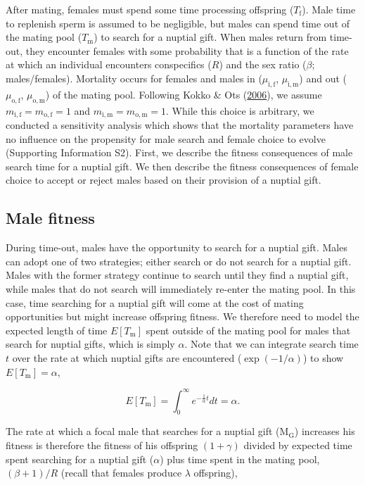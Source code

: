 \documentclass[
]{article}
\begin{document}
After mating, females must spend some time processing offspring
(\(T_{\mathrm{f}}\)). Male time to replenish sperm is assumed to be
negligible, but males can spend time out of the mating pool
(\(T_{\mathrm{m}}\)) to search for a nuptial gift. When males return
from time-out, they encounter females with some probability that is a
function of the rate at which an individual encounters conspecifics
(\(R\)) and the sex ratio (\(\beta\); males/females). Mortality occurs
for females and males in (\(\mu_{\mathrm{i,f}}\),
\(\mu_{\mathrm{i,m}}\)) and out (\(\mu_{\mathrm{o,f}}\),
\(\mu_{\mathrm{o,m}}\)) of the mating pool. Following Kokko \& Ots
(\protect\hyperlink{ref-Kokko2006}{2006}), we assume
\(m_{\mathrm{i,f}} = m_{\mathrm{o,f}} = 1\) and
\(m_{\mathrm{i,m}} = m_{\mathrm{o,m}} = 1\). While this choice is
arbitrary, we conducted a sensitivity analysis which shows that the
mortality parameters have no influence on the propensity for male search
and female choice to evolve (Supporting Information S2). First, we
describe the fitness consequences of male search time for a nuptial
gift. We then describe the fitness consequences of female choice to
accept or reject males based on their provision of a nuptial gift.

\hypertarget{male-fitness}{%
\subsection{Male fitness}\label{male-fitness}}

During time-out, males have the opportunity to search for a nuptial
gift. Males can adopt one of two strategies; either search or do not
search for a nuptial gift. Males with the former strategy continue to
search until they find a nuptial gift, while males that do not search
will immediately re-enter the mating pool. In this case, time searching
for a nuptial gift will come at the cost of mating opportunities but
might increase offspring fitness. We therefore need to model the
expected length of time \(E[T_{\mathrm{m}}]\) spent outside of the
mating pool for males that search for nuptial gifts, which is simply
\(\alpha\). Note that we can integrate search time \(t\) over the rate
at which nuptial gifts are encountered (\(\exp(-1/\alpha)\)) to show
\(E[T_{\mathrm{m}}] = \alpha\),

\[E[T_{\mathrm{m}}] = \int_{0}^{\infty}e^{- \frac{1}{\alpha}t}dt = \alpha.\]

The rate at which a focal male that searches for a nuptial gift
(\(\mathrm{M_{G}}\)) increases his fitness is therefore the fitness of
his offspring \((1 + \gamma)\) divided by expected time spent searching
for a nuptial gift (\(\alpha\)) plus time spent in the mating pool,
\((\beta + 1)/R\) (recall that females produce \(\lambda\) offspring),
\end{document}
